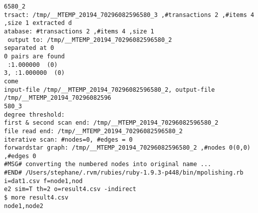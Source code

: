 \begin{Verbatim}[baselinestretch=0.7,frame=single]
6580_2
trsact: /tmp/__MTEMP_20194_70296082596580_3 ,#transactions 2 ,#items 4 ,size 1 extracted d
atabase: #transactions 2 ,#items 4 ,size 1
 output to: /tmp/__MTEMP_20194_70296082596580_2
separated at 0
0 pairs are found
 :1.000000  (0)
3, :1.000000  (0)
come
input-file /tmp/__MTEMP_20194_70296082596580_2, output-file /tmp/__MTEMP_20194_70296082596
580_3
degree threshold: 
first & second scan end: /tmp/__MTEMP_20194_70296082596580_2
file read end: /tmp/__MTEMP_20194_70296082596580_2
iterative scan: #nodes=0, #edges = 0
forwardstar graph: /tmp/__MTEMP_20194_70296082596580_2 ,#nodes 0(0,0) ,#edges 0
#MSG# converting the numbered nodes into original name ...
#END# /Users/stephane/.rvm/rubies/ruby-1.9.3-p448/bin/mpolishing.rb i=dat1.csv f=node1,nod
e2 sim=T th=2 o=result4.csv -indirect
$ more result4.csv
node1,node2
\end{Verbatim}
